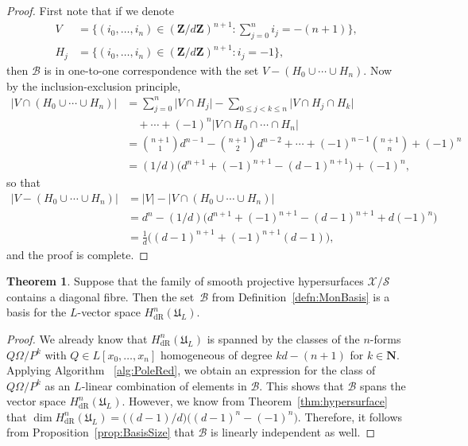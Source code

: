\documentclass[a4paper,11pt]{article}
\numberwithin{equation}{section}
\providecommand{\abs}[1]{\lvert#1\rvert}                 %
\newcommand{\NN}{\mathbf{N}} %
\newcommand{\ZZ}{\mathbf{Z}} %
\providecommand{\HdR}{H_{\text{dR}}}    %
\providecommand{\cB}{\mathcal{B}} %
\theoremstyle{definition}
\newtheorem{thm}{Theorem}[section]
\begin{document}
\begin{proof}
First note that if we denote
\begin{align*}
V   &= \{(i_0,\dotsc,i_n) \in (\ZZ/d\ZZ)^{n+1} : \sum_{j=0}^n i_j = -(n+1)\}, \\
H_j &= \{(i_0,\dotsc,i_n) \in (\ZZ/d\ZZ)^{n+1} : i_j = -1 \},
\end{align*}
then  $\cB$ is in one-to-one correspondence with the set $V-(H_0 \cup \dotsb \cup H_n)$. 
Now by the inclusion-exclusion principle, 
\begin{align*}
\abs{V \cap (H_0 \cup \dotsb \cup H_n)} 
& = \sum_{j=0}^n \abs{V \cap H_j} 
    - \sum_{0 \leq j < k \leq n} \abs{V \cap H_j \cap H_k} \\
& \quad + \dotsb + (-1)^{n} \abs{V \cap H_0 \cap \dotsb \cap H_n} \\
& = {n+1 \choose 1} d^{n-1} -{n+1 \choose 2} d^{n-2} 
    + \dotsb + (-1)^{n-1} {n+1 \choose n} + (-1)^{n} \\
& = (1/d)\bigl(d^{n+1}+(-1)^{n+1} - (d-1)^{n+1}\bigr)+(-1)^n,
\end{align*}
so that
\begin{align*}
\abs{V-(H_0 \cup \dotsb \cup H_n)}&=\abs{V}-\abs{V \cap (H_0 \cup \dotsb \cup H_n)} \\
&= d^n - (1/d)\bigl(d^{n+1}+(-1)^{n+1} - (d-1)^{n+1}+d (-1)^n \bigr) \\
&= \frac{1}{d} \bigl((d-1)^{n+1} + (-1)^{n+1}(d-1) \bigr),
\end{align*}
and the proof is complete.
\end{proof}

\begin{thm} \label{thm:Basis}
Suppose that the family of smooth projective hypersurfaces $\mathcal{X}/\mathcal{S}$ 
contains a diagonal fibre.  Then the set~$\cB$ from Definition~\ref{defn:MonBasis} 
is a basis for the $L$-vector space $\HdR^n(\mathfrak{U}_L)$.
\end{thm}

\begin{proof}
We already know that $\HdR^n(\mathfrak{U}_L)$ is spanned by the classes of the 
$n$-forms $Q \Omega / P^k$ with $Q \in L[x_0, \dotsc, x_n]$ homogeneous of degree 
$kd - (n+1)$ for $k \in \NN$. Applying Algorithm ~\ref{alg:PoleRed}, we obtain an 
expression for the class of $Q \Omega / P^k$ as an $L$-linear combination of 
elements in $\cB$.  This shows that $\cB$ spans the vector space 
$\HdR^n(\mathfrak{U}_L)$. However, we know from Theorem~\ref{thm:hypersurface} that 
$\dim \HdR^n(\mathfrak{U}_L) = \bigl((d-1)/d\bigr) \bigl( (d-1)^n - (-1)^n \bigr)$.  
Therefore, it follows from Proposition~\ref{prop:BasisSize} that $\cB$ is linearly 
independent as well.
\end{proof}
\end{document}
